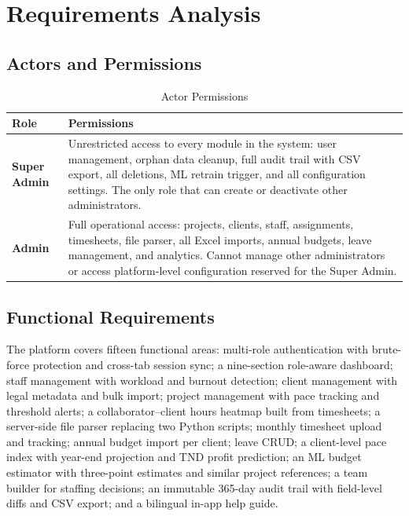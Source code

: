\documentclass[12pt,a4paper]{report}
\begin{document}
\chapter{Requirements Analysis}

\section{Actors and Permissions}

\begin{longtable}{>{\bfseries}p{2.8cm} p{10.7cm}}
  \caption{Actor Permissions}\label{tab:actors}\\
  \toprule Role & Permissions\\\midrule\endhead
  Super Admin  & Unrestricted access to every module in the system: user management, orphan data cleanup, full audit trail with CSV export, all deletions, ML retrain trigger, and all configuration settings. The only role that can create or deactivate other administrators.\\
  Admin        & Full operational access: projects, clients, staff, assignments, timesheets, file parser, all Excel imports, annual budgets, leave management, and analytics. Cannot manage other administrators or access platform-level configuration reserved for the Super Admin.\\
  \bottomrule
\end{longtable}

\section{Functional Requirements}

The platform covers fifteen functional areas: multi-role authentication with brute-force protection and cross-tab session sync; a nine-section role-aware dashboard; staff management with workload and burnout detection; client management with legal metadata and bulk import; project management with pace tracking and threshold alerts; a collaborator--client hours heatmap built from timesheets; a server-side file parser replacing two Python scripts; monthly timesheet upload and tracking; annual budget import per client; leave CRUD; a client-level pace index with year-end projection and TND profit prediction; an ML budget estimator with three-point estimates and similar project references; a team builder for staffing decisions; an immutable 365-day audit trail with field-level diffs and CSV export; and a bilingual in-app help guide.
\end{document}
